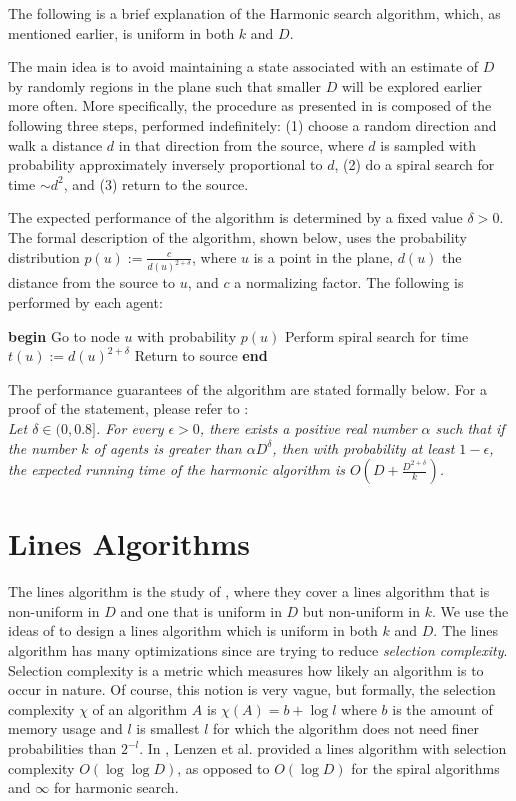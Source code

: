 \documentclass[runningheads,a4paper]{llncs}
\begin{document}
The following is a brief explanation of the Harmonic search algorithm, which, as mentioned earlier, is uniform in both $k$ and $D$.

The main idea is to avoid maintaining a state associated with an estimate of $D$ by randomly regions in the plane such that smaller $D$ will be explored earlier more often. More specifically, the procedure as presented in \cite{feinerman2012collaborative} is composed of the following three steps, performed indefinitely: (1) choose a random direction and walk a distance $d$ in that direction from the source, where $d$ is sampled with probability approximately inversely proportional to $d$, (2) do a spiral search for time $\sim d^2$, and (3) return to the source.

The expected performance of the algorithm is determined by a fixed value $\delta > 0$. The formal description of the algorithm, shown below, uses the probability distribution $p(u) := \frac{c}{d(u)^{2+\delta}}$, where $u$ is a point in the plane, $d(u)$ the distance from the source to $u$, and $c$ a normalizing factor. The following is performed by each agent:

\begin{codebox}
\li \textbf{begin}
\Then 
\li Go to node $u$ with probability $p(u)$
\li Perform spiral search for time $t(u) := d(u)^{2+\delta}$
\li Return to source 
\End
\li \textbf{end} 
\end{codebox}

The performance guarantees of the algorithm are stated formally below. For a proof of the statement, please refer to \cite{feinerman2012collaborative}: \\

\emph{
Let $\delta \in (0,0.8]$. For every $\epsilon > 0$, there exists a positive real number $\alpha$ such that if the number $k$ of agents is greater than $\alpha D^{\delta}$, then with probability at least $1-\epsilon$, the expected running time of the harmonic algorithm is $O( D + \frac{D^{2+\delta}}{k})$.
}

\section{Lines Algorithms}
\label{lines}

The lines algorithm is the study of \cite{lenzen2014trade}, where they cover a lines algorithm that is non-uniform in $D$ and one that is uniform in $D$ but non-uniform in $k$. We use the ideas of \cite{feinerman2012collaborative} to design a lines algorithm which is uniform in both $k$ and $D$. The lines algorithm has many optimizations since \cite{lenzen2014trade} are trying to reduce \emph{selection complexity}. Selection complexity is a metric which measures how likely an algorithm is to occur in nature. Of course, this notion is very vague, but formally, the selection complexity $\chi$ of an algorithm $A$ is $\chi(A) = b + \log l$ where $b$ is the amount of memory usage and $l$ is smallest $l$ for which the algorithm does not need finer probabilities than $2^{-l}$. In \cite{lenzen2014trade}, Lenzen et al. provided a lines algorithm with selection complexity $O(\log \log D)$, as opposed to $O(\log D)$ for the spiral algorithms and $\infty$ for harmonic search.
\end{document}

